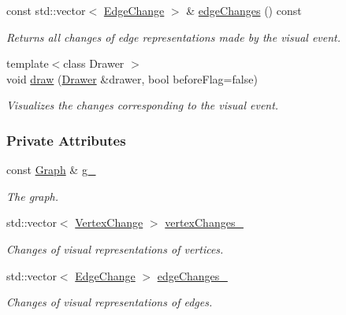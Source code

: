 \begin{DoxyCompactItemize}
const std\+::vector$<$ \hyperlink{structVisualEvent_1_1EdgeChange}{Edge\+Change} $>$ \& \hyperlink{structVisualEvent_af7b8181e67a7e67cf98a01106d70ae04}{edge\+Changes} () const 
\begin{DoxyCompactList}\small\item\em Returns all changes of edge representations made by the visual event. \end{DoxyCompactList}\item 
{\footnotesize template$<$class Drawer $>$ }\\void \hyperlink{structVisualEvent_a437e76377fdba8ce654d74cdde8726b4}{draw} (\hyperlink{structDrawer}{Drawer} \&drawer, bool before\+Flag=false)
\begin{DoxyCompactList}\small\item\em Visualizes the changes corresponding to the visual event. \end{DoxyCompactList}\end{DoxyCompactItemize}
\subsubsection*{Private Attributes}
\begin{DoxyCompactItemize}
\item 
const \hyperlink{structStateGraph}{Graph} \& \hyperlink{structVisualEvent_ad3501eff7f1d54df18a69b0e46cbaf22}{g\+\_\+}\hypertarget{structVisualEvent_ad3501eff7f1d54df18a69b0e46cbaf22}{}\label{structVisualEvent_ad3501eff7f1d54df18a69b0e46cbaf22}

\begin{DoxyCompactList}\small\item\em The graph. \end{DoxyCompactList}\item 
std\+::vector$<$ \hyperlink{structVisualEvent_1_1VertexChange}{Vertex\+Change} $>$ \hyperlink{structVisualEvent_a37bfe25b8e024cdb72dfb00b2c0da920}{vertex\+Changes\+\_\+}\hypertarget{structVisualEvent_a37bfe25b8e024cdb72dfb00b2c0da920}{}\label{structVisualEvent_a37bfe25b8e024cdb72dfb00b2c0da920}

\begin{DoxyCompactList}\small\item\em Changes of visual representations of vertices. \end{DoxyCompactList}\item 
std\+::vector$<$ \hyperlink{structVisualEvent_1_1EdgeChange}{Edge\+Change} $>$ \hyperlink{structVisualEvent_a27b35d03dd4beb606f4c739fac00bca1}{edge\+Changes\+\_\+}\hypertarget{structVisualEvent_a27b35d03dd4beb606f4c739fac00bca1}{}\label{structVisualEvent_a27b35d03dd4beb606f4c739fac00bca1}

\begin{DoxyCompactList}\small\item\em Changes of visual representations of edges. \end{DoxyCompactList}\end{DoxyCompactItemize}


